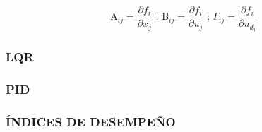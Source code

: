 
\begin{equation}
	\mathrm{A}_{ij}= \frac{\partial f_i}{\partial x_j}
	\text { ; } 
	\mathrm{B}_{ij}= \frac{\partial f_i}{\partial u_j}
	\text { ; }
	\Gamma_{ij}= \frac{\partial f_i}{\partial u_{d_j}}		
\end{equation}

\subsubsection{LQR}
\subsubsection{PID}
\subsubsection{ÍNDICES DE DESEMPEÑO}











